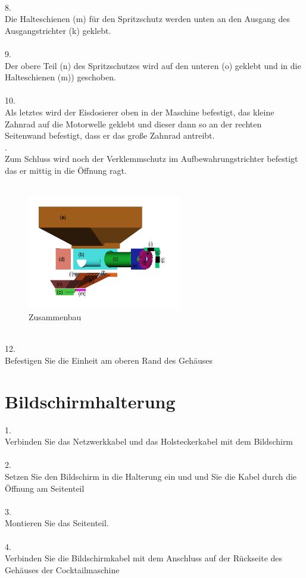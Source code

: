 \documentclass[10pt,a4paper]{report}
\begin{document}
	\\
	8.
	\\Die Halteschienen (m) für den Spritzschutz werden unten an den Ausgang des Ausgangstrichter (k) geklebt.\\
	\\
	9.\\
	Der obere Teil (n) des Spritzschutzes wird auf den unteren (o) geklebt und in die Halteschienen (m)) geschoben.\\
	\\
	10.\\
	Als letztes wird der Eisdosierer oben in der Maschine befestigt, das kleine Zahnrad auf die Motorwelle geklebt und dieser dann so an der rechten Seitenwand befestigt, dass er das große Zahnrad antreibt.\\
	.\\
	Zum Schluss wird noch der Verklemmschutz im Aufbewahrungstrichter befestigt das er mittig in die Öffnung ragt.\\
	\\
	\begin{figure}[htb]
		\includegraphics[width=0.6\textwidth]{Explosion2.png}
		\centering
		\caption{Zusammenbau}
	\end{figure}
	\\
	12.\\
	Befestigen Sie die Einheit am oberen Rand des Gehäuses
	
	\chapter{Bildschirmhalterung}
	1.\\
	 Verbinden Sie das Netzwerkkabel und das Holsteckerkabel mit dem Bildschirm\\
	 \\
	 2.\\
	 Setzen Sie den Bildschirm in die Halterung ein und und Sie die Kabel durch die Öffnung am Seitenteil\\
	 \\
	 3.\\
	 Montieren Sie das Seitenteil.\\
	 \\
	 4.\\
	 Verbinden Sie die Bildschirmkabel mit dem Anschluss auf der Rückseite des Gehäuses der Cocktailmaschine
	
\end{document}
